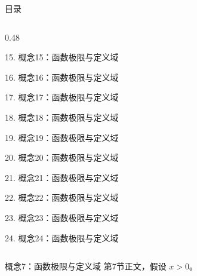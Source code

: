 \documentclass[aspectratio=169,10pt,fontset=fandol]{ctexbeamer}
\begin{document}
\begin{frame}[t,fragile]{目录}
\begin{columns}[T,onlytextwidth]
\begin{column}{0.48\textwidth}
{\color{gray!40}\small 15. 概念15：函数极限与定义域\par}\vspace{0.22em}
{\color{gray!40}\small 16. 概念16：函数极限与定义域\par}\vspace{0.22em}
{\color{gray!40}\small 17. 概念17：函数极限与定义域\par}\vspace{0.22em}
{\color{gray!40}\small 18. 概念18：函数极限与定义域\par}\vspace{0.22em}
{\color{gray!40}\small 19. 概念19：函数极限与定义域\par}\vspace{0.22em}
{\color{gray!40}\small 20. 概念20：函数极限与定义域\par}\vspace{0.22em}
{\color{gray!40}\small 21. 概念21：函数极限与定义域\par}\vspace{0.22em}
{\color{gray!40}\small 22. 概念22：函数极限与定义域\par}\vspace{0.22em}
{\color{gray!40}\small 23. 概念23：函数极限与定义域\par}\vspace{0.22em}
{\color{gray!40}\small 24. 概念24：函数极限与定义域\par}\vspace{0.22em}
\end{column}
\end{columns}
\end{frame}
\begin{frame}[t,fragile]{概念7：函数极限与定义域}
\normalsize
{\normalsize
第7节正文，假设 $x>0$。
}
\end{frame}
\end{document}
